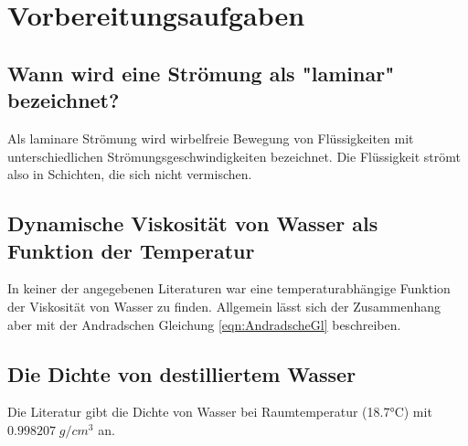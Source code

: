 \section{Vorbereitungsaufgaben}
\label{sec:Vorbereitungsaufgaben}

\subsection{Wann wird eine Strömung als "laminar" bezeichnet?}
    Als laminare Strömung  wird wirbelfreie Bewegung von Flüssigkeiten mit unterschiedlichen Strömungsgeschwindigkeiten bezeichnet. Die Flüssigkeit strömt also in Schichten, die sich nicht vermischen.
    
\subsection{Dynamische Viskosität von Wasser als Funktion der Temperatur}
    In keiner der angegebenen Literaturen war eine temperaturabhängige Funktion der Viskosität von Wasser zu finden. Allgemein lässt sich der Zusammenhang aber mit der Andradschen 
    Gleichung \eqref{eqn:AndradscheGl} beschreiben.

\subsection{Die Dichte von destilliertem Wasser} \label{wasserdichte}
    Die Literatur gibt die Dichte von Wasser bei Raumtemperatur (18.7°C) mit $0.998207 \;\unit{g/cm^3}$ an.